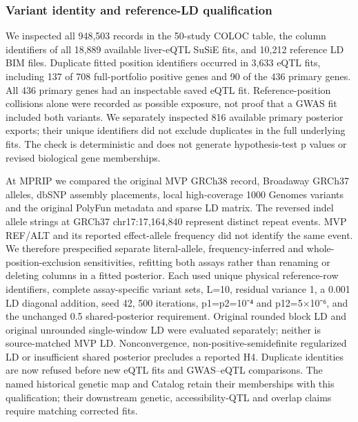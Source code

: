 \subsubsection{Variant identity and reference-LD qualification}\label{variant-identity-and-reference-ld-qualification}

We inspected all 948,503 records in the 50-study COLOC table, the column
identifiers of all 18,889 available liver-eQTL SuSiE fits, and 10,212 reference
LD BIM files. Duplicate fitted position identifiers occurred in 3,633 eQTL
fits, including 137 of 708 full-portfolio positive genes and 90 of the 436
primary genes. All 436 primary genes had an inspectable saved eQTL fit.
Reference-position collisions alone were recorded as possible exposure, not
proof that a GWAS fit included both variants. We separately inspected 816
available primary posterior exports; their unique identifiers did not exclude
duplicates in the full underlying fits. The check is deterministic and does
not generate hypothesis-test p values or revised biological gene memberships.

At MPRIP we compared the original MVP GRCh38 record, Broadaway GRCh37 alleles,
dbSNP assembly placements, local high-coverage 1000 Genomes variants and the
original PolyFun metadata and sparse LD matrix. The reversed indel allele
strings at GRCh37 chr17:17,164,840 represent distinct repeat events. MVP
REF/ALT and its reported effect-allele frequency did not identify the same
event. We therefore prespecified separate literal-allele, frequency-inferred
and whole-position-exclusion sensitivities, refitting both assays rather than
renaming or deleting columns in a fitted posterior. Each used unique physical
reference-row identifiers, complete assay-specific variant sets, L=10,
residual variance 1, a 0.001 LD diagonal addition, seed 42, 500 iterations,
p1=p2=10⁻⁴ and p12=5×10⁻⁶, and the unchanged 0.5 shared-posterior requirement.
Original rounded block LD and original unrounded single-window LD were
evaluated separately; neither is source-matched MVP LD. Nonconvergence,
non-positive-semidefinite regularized LD or insufficient shared posterior
precludes a reported H4. Duplicate identities are now refused before new
eQTL fits and GWAS--eQTL comparisons. The named historical genetic map and
Catalog retain their memberships with this qualification; their downstream
genetic, accessibility-QTL and overlap claims require matching corrected fits.

